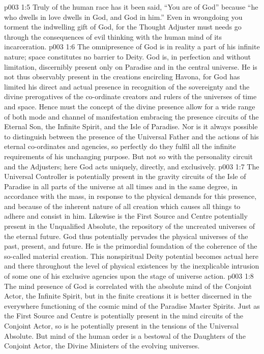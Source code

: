 \vs p003 1:5 Truly of the human race has it been said, “You are of God” because “he who dwells in love dwells in God, and God in him.” Even in wrongdoing you torment the indwelling gift of God, for the Thought Adjuster must needs go through the consequences of evil thinking with the human mind of its incarceration.
\vs p003 1:6 \pc The omnipresence of God is in reality a part of his infinite nature; space constitutes no barrier to Deity. God is, in perfection and without limitation, discernibly present only on Paradise and in the central universe. He is not thus observably present in the creations encircling Havona, for God has limited his direct and actual presence in recognition of the sovereignty and the divine prerogatives of the co\hyp{}ordinate creators and rulers of the universes of time and space. Hence must the concept of the divine presence allow for a wide range of both mode and channel of manifestation embracing the presence circuits of the Eternal Son, the Infinite Spirit, and the Isle of Paradise. Nor is it always possible to distinguish between the presence of the Universal Father and the actions of his eternal co\hyp{}ordinates and agencies, so perfectly do they fulfil all the infinite requirements of his unchanging purpose. But not so with the personality circuit and the Adjusters; here God acts uniquely, directly, and exclusively.
\vs p003 1:7 \pc The Universal Controller is potentially present in the gravity circuits of the Isle of Paradise in all parts of the universe at all times and in the same degree, in accordance with the mass, in response to the physical demands for this presence, and because of the inherent nature of all creation which causes all things to adhere and consist in him. Likewise is the First Source and Centre potentially present in the Unqualified Absolute, the repository of the uncreated universes of the eternal future. God thus potentially pervades the physical universes of the past, present, and future. He is the primordial foundation of the coherence of the so\hyp{}called material creation. This nonspiritual Deity potential becomes actual here and there throughout the level of physical existences by the inexplicable intrusion of some one of his exclusive agencies upon the stage of universe action.
\vs p003 1:8 The mind presence of God is correlated with the absolute mind of the Conjoint Actor, the Infinite Spirit, but in the finite creations it is better discerned in the everywhere functioning of the cosmic mind of the Paradise Master Spirits. Just as the First Source and Centre is potentially present in the mind circuits of the Conjoint Actor, so is he potentially present in the tensions of the Universal Absolute. But mind of the human order is a bestowal of the Daughters of the Conjoint Actor, the Divine Ministers of the evolving universes.
